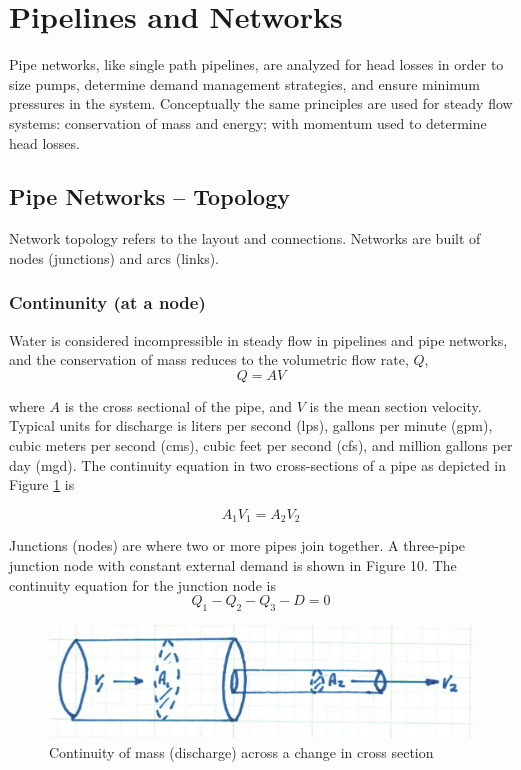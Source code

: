 \section{Pipelines and Networks}
Pipe networks, like single path pipelines, are analyzed for head losses in order to size pumps, determine demand management strategies, and ensure minimum pressures in the system.   Conceptually the same principles are used for steady flow systems: conservation of mass and energy; with momentum used to determine head losses.

\subsection{Pipe Networks -- Topology}
Network topology refers to the layout and connections.  
Networks are built of nodes (junctions) and arcs (links).  
\subsubsection{Continunity (at a node)}

Water is considered incompressible in steady flow in pipelines and pipe networks, and the
conservation of mass reduces to the volumetric 
flow rate, $Q$,
\begin{equation}
Q = AV 
\end{equation}

where $A$ is the cross sectional of the pipe, and $V$ is the mean section velocity. Typical units
for discharge is liters per second (lps), gallons per minute (gpm), cubic meters per second
(cms), cubic feet per second (cfs), and million gallons per day (mgd). 
The continuity equation in two cross-sections of a pipe as depicted in Figure \ref{fig:continuity-across-sections} is

\begin{equation}
A_1V_1 = A_2V_2
\end{equation}

Junctions (nodes) are where two or more pipes join together. 
A three-pipe junction node with constant external demand is shown in Figure 10. The continuity equation for the
junction node is
\begin{equation}
Q_1 - Q_2 - Q_3 - D = 0
\end{equation}

\begin{figure}[h!] %
   \centering
   \includegraphics[width=5in]{./8-PipeNetworkHydraulics/continuity-across-sections.jpg} 
   \caption{Continuity of mass (discharge) across a change in cross section}
   \label{fig:continuity-across-sections}
\end{figure}

